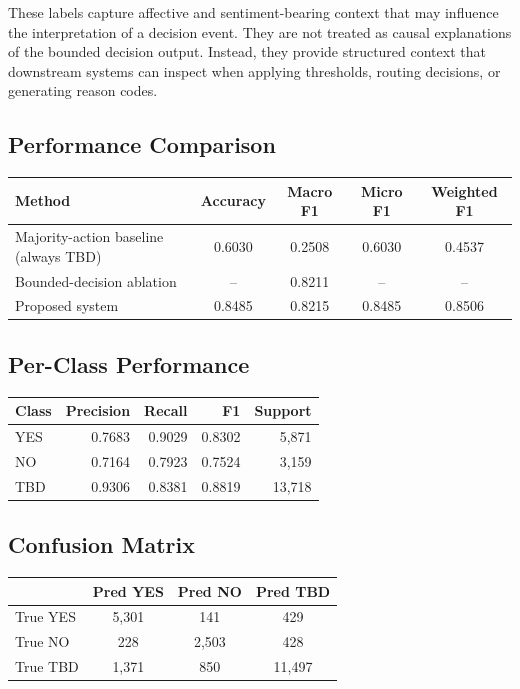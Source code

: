 \documentclass[11pt]{article}
\begin{document}
These labels capture affective and sentiment-bearing context that may influence the interpretation
of a decision event. They are not treated as causal explanations of the bounded decision output.
Instead, they provide structured context that downstream systems can inspect when applying
thresholds, routing decisions, or generating reason codes.

\subsection{Performance Comparison}

\begin{center}
\begin{tabular}{lcccc}
\toprule
Method & Accuracy & Macro F1 & Micro F1 & Weighted F1 \\
\midrule
Majority-action baseline (always TBD) & 0.6030 & 0.2508 & 0.6030 & 0.4537 \\
Bounded-decision ablation & -- & 0.8211 & -- & -- \\
Proposed system & 0.8485 & 0.8215 & 0.8485 & 0.8506 \\
\bottomrule
\end{tabular}
\end{center}

\subsection{Per-Class Performance}

\begin{center}
\begin{tabular}{lrrrr}
\toprule
Class & Precision & Recall & F1 & Support \\
\midrule
YES & 0.7683 & 0.9029 & 0.8302 & 5,871 \\
NO & 0.7164 & 0.7923 & 0.7524 & 3,159 \\
TBD & 0.9306 & 0.8381 & 0.8819 & 13,718 \\
\bottomrule
\end{tabular}
\end{center}

\subsection{Confusion Matrix}

\begin{center}
\begin{tabular}{lccc}
\toprule
 & Pred YES & Pred NO & Pred TBD \\
\midrule
True YES & 5,301 & 141 & 429 \\
True NO & 228 & 2,503 & 428 \\
True TBD & 1,371 & 850 & 11,497 \\
\bottomrule
\end{tabular}
\end{center}
\end{document}
